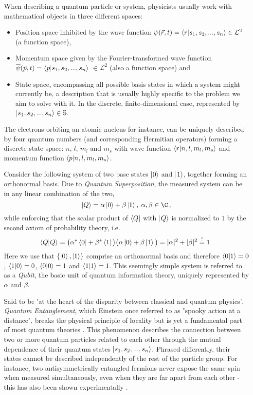 When describing a quantum particle or system, physicists usually work with mathematical objects in three different spaces:
\begin{itemize}
  \item Position space inhibited by the wave function $\psi(\vec{r}, t) = \braket{r | s_1, s_2, ..., s_n} \in \mathcal{L}^2$ (a function space),
  \item Momentum space given by the Fourier-transformed wave function $\overline{\psi}(\vec{p}, t) = \braket{p | s_1, s_2, ..., s_n}$ $\in \mathcal{L}^2$ (also a function space) and
  \item State space, encompassing all possible basis states in which a system might currently be, a description that is usually highly specific to the problem we aim to solve with it.
        In the discrete, finite-dimensional case, represented by $\ket{s_1, s_2, ..., s_n} \in \mathbb{S}$.
\end{itemize}

The electrons orbiting an atomic nucleus for instance, can be uniquely described by four quantum numbers (and corresponding Hermitian operators) forming a discrete state space: $n$, $l$, $m_l$ and $m_s$ with wave function $\braket{r | n, l, m_l, m_s}$ and momentum function $\braket{p | n, l, m_l, m_s}$.

Consider the following system of two base states $\ket{0}$ and $\ket{1}$, together forming an orthonormal basis.
Due to \textit{Quantum Superposition}, the measured system can be in any linear combination of the two,
$$\ket{Q} = \alpha \ket{0} + \beta \ket{1},\; \alpha, \beta \in \C\,,$$
while enforcing that the scalar product of $\bra{Q}$ with $\ket{Q}$ is normalized to $1$ by the second axiom of probability theory, i.e. $$\braket{Q | Q} = \big(\alpha^* \bra{0} + \beta^* \bra{1}\big)\big(\alpha \ket{0} + \beta \ket{1}\big) = |\alpha|^2 + |\beta|^2 \overset{!}{=} 1 \,.$$
Here we use that $\{\ket{0}, \ket{1}\}$ comprise an orthonormal basis and therefore $\braket{0|1} = 0$, $\braket{1|0} = 0$, $\braket{0|0} = 1$ and $\braket{1|1} = 1$.
This seemingly simple system is referred to as a \textit{Qubit}, the basic unit of quantum information theory, uniquely represented by $\alpha$ and $\beta$.

Said to be 'at the heart of the disparity between classical and quantum physics', \textit{Quantum Entanglement}, which Einstein once referred to as "spooky action at a distance", breaks the physical principle of locality but is yet a fundamental part of most quantum theories \parencite{1989-unspeakable-qm}.
This phenomenon describes the connection between two or more quantum particles related to each other through the mutual dependence of their quantum states $\ket{s_1, s_2, ..., s_n}$.
Phrased differently, their states cannot be described independently of the rest of the particle group.
For instance, two antisymmetrically entangled fermions never expose the same spin when measured simultaneously, even when they are far apart from each other - this has also been shown experimentally \parencite{2013-entanglement-proof}.

